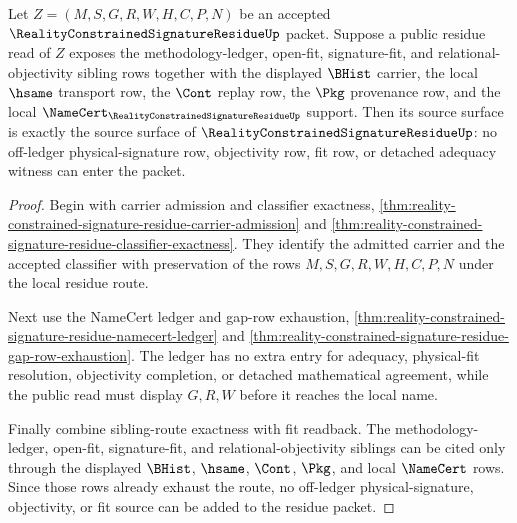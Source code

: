 \begin{theorem}
\label{thm:reality-constrained-signature-residue-source-exactness}
Let $Z=(M,S,G,R,W,H,C,P,N)$ be an accepted
$\RealityConstrainedSignatureResidueUp$ packet. Suppose a public residue read
of $Z$ exposes the methodology-ledger, open-fit, signature-fit, and
relational-objectivity sibling rows together with the displayed $\BHist$ carrier,
the local $\hsame$ transport row, the $\Cont$ replay row, the $\Pkg$ provenance
row, and the local $\NameCert_{\RealityConstrainedSignatureResidueUp}$ support.
Then its source surface is exactly the source surface of
$\RealityConstrainedSignatureResidueUp$: no off-ledger physical-signature row,
objectivity row, fit row, or detached adequacy witness can enter the packet.
\end{theorem}
\begin{proof}
Begin with carrier admission and classifier exactness,
\autoref{thm:reality-constrained-signature-residue-carrier-admission} and
\autoref{thm:reality-constrained-signature-residue-classifier-exactness}. They
identify the admitted carrier and the accepted classifier with preservation of
the rows $M,S,G,R,W,H,C,P,N$ under the local residue route.

Next use the NameCert ledger and gap-row exhaustion,
\autoref{thm:reality-constrained-signature-residue-namecert-ledger} and
\autoref{thm:reality-constrained-signature-residue-gap-row-exhaustion}. The
ledger has no extra entry for adequacy, physical-fit resolution, objectivity
completion, or detached mathematical agreement, while the public read must
display $G,R,W$ before it reaches the local name.

Finally combine sibling-route exactness with fit readback. The methodology-ledger,
open-fit, signature-fit, and relational-objectivity siblings can be cited only
through the displayed $\BHist$, $\hsame$, $\Cont$, $\Pkg$, and local $\NameCert$
rows. Since those rows already exhaust the route, no off-ledger physical-signature,
objectivity, or fit source can be added to the residue packet.
\end{proof}

